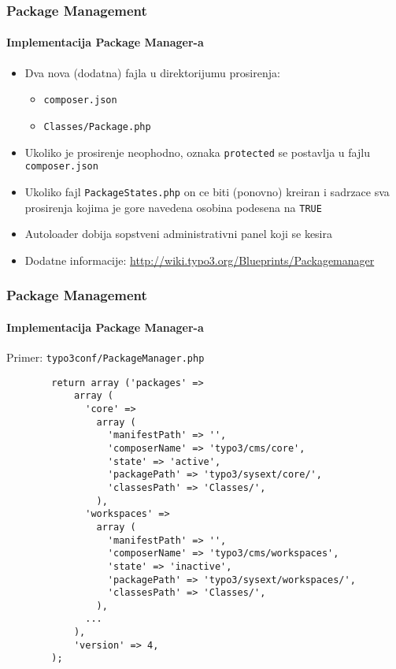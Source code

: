 \begin{frame}[fragile]
	\frametitle{Package Management}
	\framesubtitle{Implementacija Package Manager-a}

	\begin{itemize}

		\item Dva nova (dodatna) fajla u direktorijumu prosirenja:

			\begin{itemize}
				\item \texttt{composer.json}
				\item \texttt{Classes/Package.php}
			\end{itemize}

		\item Ukoliko je prosirenje neophodno, oznaka \texttt{protected}\newline
			se postavlja u fajlu \texttt{composer.json}

		\item Ukoliko fajl \texttt{PackageStates.php} on ce biti (ponovno) kreiran\newline
			i sadrzace sva prosirenja kojima je gore navedena osobina podesena na \texttt{TRUE}

		\item Autoloader dobija sopstveni administrativni panel koji se kesira

		\item Dodatne informacije:\newline
			\url{http://wiki.typo3.org/Blueprints/Packagemanager}

	\end{itemize}

\end{frame}


\begin{frame}[fragile]
	\frametitle{Package Management}
	\framesubtitle{Implementacija Package Manager-a}

	Primer: \texttt{typo3conf/PackageManager.php}

	\lstset{
		basicstyle=\tiny\ttfamily
	}

	\begin{lstlisting}
		return array ('packages' =>
		    array (
		      'core' =>
		        array (
		          'manifestPath' => '',
		          'composerName' => 'typo3/cms/core',
		          'state' => 'active',
		          'packagePath' => 'typo3/sysext/core/',
		          'classesPath' => 'Classes/',
		        ),
		      'workspaces' =>
		        array (
		          'manifestPath' => '',
		          'composerName' => 'typo3/cms/workspaces',
		          'state' => 'inactive',
		          'packagePath' => 'typo3/sysext/workspaces/',
		          'classesPath' => 'Classes/',
		        ),
		      ...
		    ),
		    'version' => 4,
		);
	\end{lstlisting}

\end{frame}

